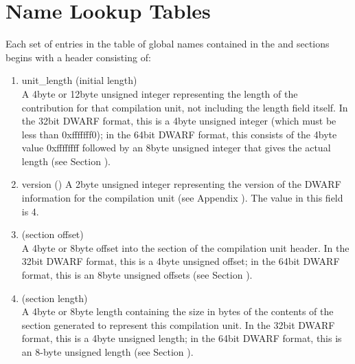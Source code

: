 \section{Name Lookup Tables}
\label{datarep:namelookuptables}

Each set of entries in the table of global names contained
in the  and 
 sections begins
with a header consisting of:


\begin{enumerate}[1.]
\item unit\_length (initial length) \\
A 4\dash byte or 12\dash byte unsigned integer 
representing the length
of the 
contribution for that compilation unit,
not including the length field itself. In the 32\dash bit DWARF
format, this is a 4\dash byte unsigned integer (which must be less
than 0xfffffff0); in the 64\dash bit DWARF format, this consists
of the 4\dash byte value 0xffffffff followed by an 8\dash byte unsigned
integer that gives the actual length
(see Section ).

\item  version ()
A 2\dash byte unsigned integer representing the version of the
DWARF information for the compilation unit
(see Appendix ).
The value in this field is 4.

\item {} (section offset) \\
A 
4\dash byte or 8\dash byte 
offset into the 
section of the compilation unit header.
In
the 32\dash bit DWARF format, this is a 4\dash byte unsigned offset;
in the 64\dash bit DWARF format, this is an 8\dash byte unsigned offsets
(see Section ).

\item  {} (section length) \\
A 
4\dash byte or 8\dash byte length containing the size in bytes of the
contents of the 
section generated to represent
this compilation unit. In the 32\dash bit DWARF format, this is
a 4\dash byte unsigned length; in the 64\dash bit DWARF format, this
is an 8-byte unsigned length 
(see Section ).


\end{enumerate}


